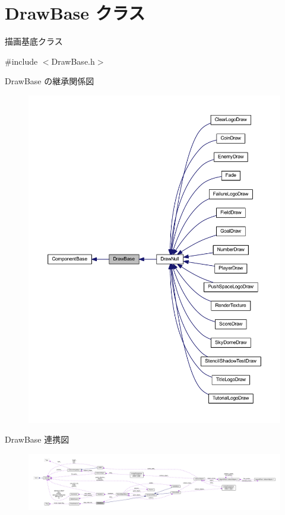 \hypertarget{class_draw_base}{}\section{Draw\+Base クラス}
\label{class_draw_base}


描画基底クラス  




{\ttfamily \#include $<$Draw\+Base.\+h$>$}



Draw\+Base の継承関係図
\nopagebreak
\begin{figure}[H]
\begin{center}
\leavevmode
\includegraphics[width=350pt]{class_draw_base__inherit__graph}
\end{center}
\end{figure}


Draw\+Base 連携図\nopagebreak
\begin{figure}[H]
\begin{center}
\leavevmode
\includegraphics[width=350pt]{class_draw_base__coll__graph}
\end{center}
\end{figure}
